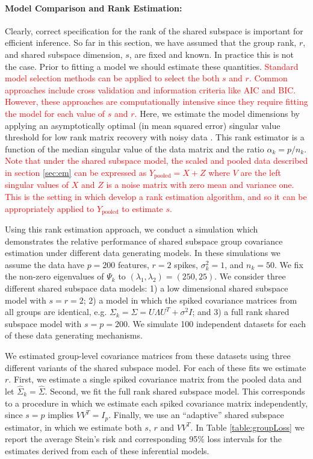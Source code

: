 \documentclass{statsoc}
\newcommand{\edits}[1]{{\textsf{\textcolor{red}{#1}}}}
\newcommand{\edits}[1]{#1}
\begin{document}
\paragraph{Model Comparison and Rank Estimation:}

Clearly, correct specification for the rank of the shared subspace is
important for efficient inference.  So far in this section, we have
assumed that the group rank, $r$, and shared subspace dimension, $s$,
are fixed and known.  In practice this is not the case.  Prior to
fitting a model we should estimate these quantities.  \edits{Standard
  model selection methods can be applied to select the both $s$
  and $r$.  Common approaches include cross validation and information
  criteria like AIC and BIC.  However, these approaches are
  computationally intensive since they require fitting the model for
  each value of $s$ and $r$.}  Here, we estimate the model dimensions
by applying an asymptotically optimal (in mean squared error) singular
value threshold for low rank matrix recovery with noisy data
\citep{Gavish2014}.  This rank estimator is a function of the median
singular value of the data matrix and the ratio $\alpha_k = p/n_k$.
\edits{Note that under the shared subspace model, the scaled and
  pooled data described in section \ref{sec:em} can be expressed as
  $Y_{\text{pooled}} = X + Z$ where $V$ are the left singular values
  of $X$ and $Z$ is a noise matrix with zero mean and variance one.
  This is the setting in which \citet{Gavish2014} develop a rank
  estimation algorithm, and so it can be appropriately applied
  to $Y_{\text{pooled}}$ to estimate $s$.}

Using this rank estimation approach, we conduct a simulation which
demonstrates the relative performance of shared subspace group
covariance estimation under different data generating models.  In
these simulations we assume the data have $p=200$ features, $r=2$
spikes, $\sigma^2_k=1$, and $n_k = 50$.  We fix the non-zero eigenvalues of
$\Psi_k$ to $(\lambda_1, \lambda_2) = (250, 25)$.  We consider three
different shared subspace data models: 1) a low dimensional shared
subspace model with $s=r=2$; 2) a model in which the spiked covariance
matrices from all groups are identical, e.g.
$\Sigma_k = \Sigma = U\Lambda U^T + \sigma^2I$; and 3) a full rank
shared subspace model with $s=p=200$.  We simulate 100 independent
datasets for each of these data generating mechanisms.

We estimated group-level covariance matrices from these datasets using three different variants of the shared
subspace model.  For each of these fits we estimate $r$.  First, we
estimate a single spiked covariance matrix from the pooled data and
let $\hat{\Sigma}_k = \hat{\Sigma}$.  Second, we fit the full rank
shared subspace model.  This corresponds to a procedure in which we
estimate each spiked covariance matrix independently, since $s=p$
implies $VV^T = I_p$.  Finally, we use an ``adaptive'' shared subspace
estimator, in which we estimate both $s$, $r$ and $VV^T$.  In Table
\ref{table:groupLoss} we report the average Stein's risk and
corresponding 95\% loss intervals for the estimates derived from each
of these inferential models.
\end{document}
